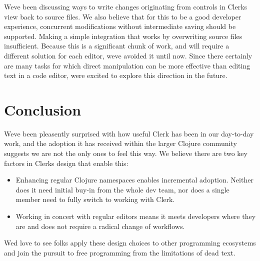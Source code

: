 \documentclass[sigconf,screen]{acmart}
\providecommand{\tightlist}{%
  \setlength{\itemsep}{0pt}\setlength{\parskip}{0pt}}
\begin{document}
We\textquotesingle ve been discussing ways to write changes originating from controls in Clerk\textquotesingle s view back to source files. We also believe that for this to be a good developer experience, concurrent modifications without intermediate saving should be supported. Making a simple integration that works by overwriting source files insufficient. Because this is a significant chunk of work, and will require a different solution for each editor, we\textquotesingle ve avoided it until now. Since there certainly are many tasks for which direct manipulation can be more effective than editing text in a code editor, we\textquotesingle re excited to explore this direction in the future.

\hypertarget{conclusion}{%
\section{Conclusion}\label{conclusion}}

We\textquotesingle ve been pleasently surprised with how useful Clerk has been in our day-to-day work, and the adoption it has received within the larger Clojure community suggests we are not the only ones to feel this way. We believe there are two key factors in Clerk\textquotesingle s design that enable this:

\begin{itemize}
\tightlist
\item
  Enhancing regular Clojure namespaces enables incremental adoption. Neither does it need initial buy-in from the whole dev team, nor does a single member need to fully switch to working with Clerk.
\item
  Working in concert with regular editors means it meets developers where they are and does not require a radical change of workflows.
\end{itemize}

We\textquotesingle d love to see folks apply these design choices to other programming ecosystems and join the pursuit to free programming from the limitations of dead text.
\end{document}
